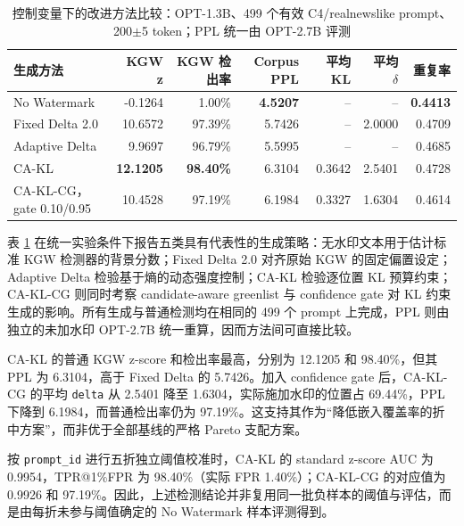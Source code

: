 \documentclass[a4paper,UTF8,zihao=5]{ctexart}
\newcommand{\method}{CA-KL}
\newcommand{\fullmethod}{CA-KL-CG}
\begin{document}
\begin{table}[H]
    \centering
    \caption{控制变量下的改进方法比较：OPT-1.3B、499 个有效 C4/realnewslike prompt、200$\pm$5 token；PPL 统一由 OPT-2.7B 评测}
    \label{tab:improved-results}
    \scriptsize
    \setlength{\tabcolsep}{2.5pt}
    \begin{tabularx}{\textwidth}{p{}rrrrrr}
        \toprule
        生成方法                         & KGW z            & KGW 检出率          & Corpus PPL      & 平均 KL       & 平均 $\delta$ & 重复率             \\
        \midrule
        No Watermark                 & -0.1264          & 1.00\%           & \textbf{4.5207} & --          & --          & \textbf{0.4413} \\
        Fixed Delta 2.0              & 10.6572          & 97.39\%          & 5.7426          & --          & 2.0000      & 0.4709          \\
        Adaptive Delta               & 9.9697           & 96.79\%          & 5.5995          & --          & --          & 0.4685          \\
        \method{}                    & \textbf{12.1205} & \textbf{98.40\%} & 6.3104          & 0.3642      & 2.5401      & 0.4728          \\
        \fullmethod{}，gate 0.10/0.95 & 10.4528          & 97.19\%          & 6.1984          & 0.3327      & 1.6304      & 0.4614          \\
        \bottomrule
    \end{tabularx}
\end{table}

表 \ref{tab:improved-results} 在统一实验条件下报告五类具有代表性的生成策略：无水印文本用于估计标准 KGW 检测器的背景分数；Fixed Delta 2.0 对齐原始 KGW 的固定偏置设定；Adaptive Delta 检验基于熵的动态强度控制；\method{} 检验逐位置 KL 预算约束；\fullmethod{} 则同时考察 candidate-aware greenlist 与 confidence gate 对 KL 约束生成的影响。所有生成与普通检测均在相同的 499 个 prompt 上完成，PPL 则由独立的未加水印 OPT-2.7B 统一重算，因而方法间可直接比较。

\method{} 的普通 KGW z-score 和检出率最高，分别为 12.1205 和 98.40\%，但其 PPL 为 6.3104，高于 Fixed Delta 的 5.7426。加入 confidence gate 后，\fullmethod{} 的平均 \texttt{delta} 从 2.5401 降至 1.6304，实际施加水印的位置占 69.44\%，PPL 下降到 6.1984，而普通检出率仍为 97.19\%。这支持其作为“降低嵌入覆盖率的折中方案”，而非优于全部基线的严格 Pareto 支配方案。

按 \texttt{prompt\_id} 进行五折独立阈值校准时，\method{} 的 standard z-score AUC 为 0.9954，TPR@1\%FPR 为 98.40\%（实际 FPR 1.40\%）；\fullmethod{} 的对应值为 0.9926 和 97.19\%。因此，上述检测结论并非复用同一批负样本的阈值与评估，而是由每折未参与阈值确定的 No Watermark 样本评测得到。
\end{document}
